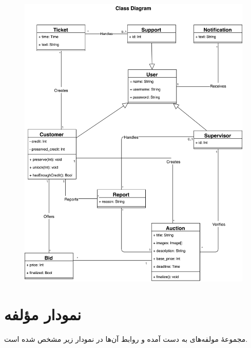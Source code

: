 \documentclass{article}
\begin{document}
\begin{figure}[htp]
\includegraphics[width = 1\textwidth]{../Class Diagram/Class Diagram.jpg}
\caption{}
\label{erd}
\end{figure}

\newpage

\section{نمودار مؤلفه}

مجموعهٔ مولفه‌های به دست آمده و روابط آن‌ها در نمودار زیر مشخص شده است.
\end{document}
